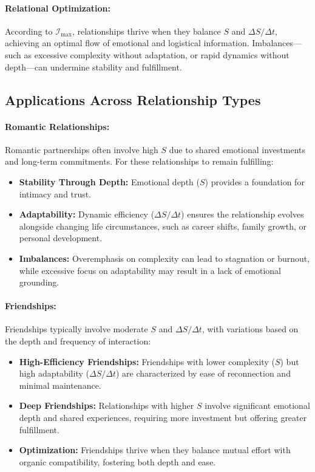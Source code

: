 \documentclass[12pt]{article}
\begin{document}
\paragraph{Relational Optimization:}
According to \(\mathcal{I}_{\text{max}}\), relationships thrive when they balance \( S \) and \( \Delta S / \Delta t \), achieving an optimal flow of emotional and logistical information. Imbalances—such as excessive complexity without adaptation, or rapid dynamics without depth—can undermine stability and fulfillment.

\subsection{Applications Across Relationship Types}

\paragraph{Romantic Relationships:}
Romantic partnerships often involve high \( S \) due to shared emotional investments and long-term commitments. For these relationships to remain fulfilling:
\begin{itemize}
    \item \textbf{Stability Through Depth:} Emotional depth (\( S \)) provides a foundation for intimacy and trust.
    \item \textbf{Adaptability:} Dynamic efficiency (\( \Delta S / \Delta t \)) ensures the relationship evolves alongside changing life circumstances, such as career shifts, family growth, or personal development.
    \item \textbf{Imbalances:} Overemphasis on complexity can lead to stagnation or burnout, while excessive focus on adaptability may result in a lack of emotional grounding.
\end{itemize}

\paragraph{Friendships:}
Friendships typically involve moderate \( S \) and \( \Delta S / \Delta t \), with variations based on the depth and frequency of interaction:
\begin{itemize}
    \item \textbf{High-Efficiency Friendships:} Friendships with lower complexity (\( S \)) but high adaptability (\( \Delta S / \Delta t \)) are characterized by ease of reconnection and minimal maintenance.
    \item \textbf{Deep Friendships:} Relationships with higher \( S \) involve significant emotional depth and shared experiences, requiring more investment but offering greater fulfillment.
    \item \textbf{Optimization:} Friendships thrive when they balance mutual effort with organic compatibility, fostering both depth and ease.
\end{itemize}
\end{document}
